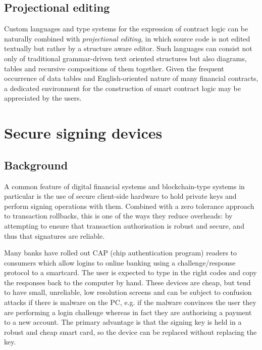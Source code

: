 \documentclass{article}
\begin{document}
\subsection{Projectional editing}

Custom languages and type systems for the expression of contract logic can be naturally combined with \emph{projectional
editing}, in which source code is not edited textually but rather by a structure aware
editor\cite{DBLP:conf/models/VoelterL14}. Such languages can consist not only of traditional grammar-driven text
oriented structures but also diagrams, tables and recursive compositions of them together. Given the frequent occurrence
of data tables and English-oriented nature of many financial contracts, a dedicated environment for the construction of
smart contract logic may be appreciated by the users.

\section{Secure signing devices}\label{sec:secure-signing-devices}

\subsection{Background}

A common feature of digital financial systems and blockchain-type systems in particular is the use of secure client-side
hardware to hold private keys and perform signing operations with them. Combined with a zero tolerance approach to
transaction rollbacks, this is one of the ways they reduce overheads: by attempting to ensure that transaction
authorisation is robust and secure, and thus that signatures are reliable.

Many banks have rolled out CAP (chip authentication program) readers to consumers which allow logins to online banking using a
challenge/response protocol to a smartcard. The user is expected to type in the right codes and copy the responses back
to the computer by hand. These devices are cheap, but tend to have small, unreliable, low resolution screens and can be
subject to confusion attacks if there is malware on the PC, e.g. if the malware convinces the user they are performing
a login challenge whereas in fact they are authorising a payment to a new account. The primary advantage is that the
signing key is held in a robust and cheap smart card, so the device can be replaced without replacing the key.
\end{document}
